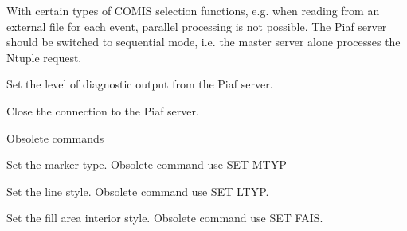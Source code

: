    \par
With certain types of COMIS selection functions, e.g. when reading from an 
   external file for each event, parallel processing is not possible.  The 
   Piaf server should be switched to sequential mode, i.e. the master server 
   alone processes the Ntuple request.  

\ENDCMD


\BEGARG
{}
\ENDARG

   \par
Set the level of diagnostic output from the Piaf server.  

\ENDCMD


   \par
Close the connection to the Piaf server.  

\ENDCMD
{}
\ifMENUtext
   \par
Obsolete commands 


\fi
{}
\ifMENUtext

\fi
{}
\ifMENUtext

\fi


\BEGARG
{}
\ENDARG

   \par
Set the marker type.  Obsolete command use SET MTYP 

\ENDCMD


\BEGARG
{}
\ENDARG

   \par
Set the line style.  Obsolete command use  SET LTYP.  

\ENDCMD


\BEGARG
{}
\ENDARG

   \par
Set the fill area interior style.  Obsolete command use SET FAIS.  

\ENDCMD

